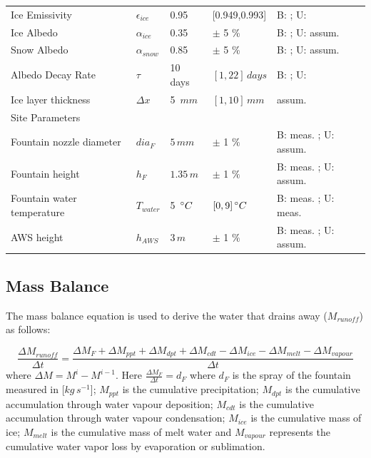 \documentclass[utf8]{frontiersSCNS} %
\begin{document}
\begin{table}[p]
\begin{tabularx}{\linewidth}{ X l X l X  }
        Ice Emissivity        & $\epsilon_{ice}$ & 0.95 & [0.949,0.993] & B: \citeauthor{CuffeyPaterson_2010}; U:
        \citeauthor{HORI2006486}\\
        Ice Albedo         & $\alpha_{ice}$ & 0.35 & $\pm$ 5 \%  & B: \citeauthor{CuffeyPaterson_2010}; U: assum.   \\
        
        Snow Albedo        & $\alpha_{snow}$ & 0.85 & $\pm$ 5 \% & B: \citeauthor{CuffeyPaterson_2010}; U: assum.  \\
        Albedo Decay Rate & $\tau$ & 10 days & $[1,22]\, days$ & B: \citeauthor{Schmidt_2017}; U:
        \citeauthor{OerlemansKnap_1998}  \\ Ice layer thickness & $\Delta x$ & 5 $\,mm$ & $[1,10]\, mm$   & assum.\\
        
        \hline Site Parameters& & & & \\ \hline Fountain nozzle diameter & $dia_{F}$ & $5 \,mm$ & $\pm$ 1 $\%$   & B:
        meas. ; U: assum.\\ Fountain height & $h_{F}$ & $1.35 \,m$ &  $\pm$ 1 $\%$   & B: meas. ; U: assum.\\ Fountain
        water temperature & $T_{water}$ & 5 $\,\degree C$ & $[0,9] \,\degree C$   & B: meas. ; U: meas.\\ AWS height &
        $h_{AWS}$ & $3 \,m$ & $\pm$ 1 $\%$   & B: meas. ; U: assum.\\
        
        \hline \end{tabularx} \label{table:parameters} \end{table} \clearpage

\subsection{Mass Balance} 
The mass balance equation is used to derive the water that drains away ($M_{runoff}$) as follows:

\begin{equation} \frac{\Delta M_{runoff}}{\Delta t} = \frac{\Delta M_{F} + \Delta M_{ppt} + \Delta M_{dpt} + \Delta
M_{cdt} - \Delta M_{ice} -\Delta M_{melt} - \Delta M_{vapour}}{\Delta t} \label{eqn:M} \end{equation}
where $\Delta M = M^{i} - M^{i-1}$. Here $\frac{\Delta M_{F}}{\Delta t} = d_F$ where $d_F$ is the spray of the
fountain measured in [$kg\,s^{-1}$]; $M_{ppt}$ is the cumulative precipitation; $M_{dpt}$ is the cumulative
accumulation through water vapour deposition; $M_{cdt}$ is the cumulative accumulation through water vapour
condensation; $M_{ice}$ is the cumulative mass of ice; $M_{melt}$ is the cumulative mass of melt water and
$M_{vapour}$ represents the cumulative water vapor loss by evaporation or sublimation. 
\end{document}
